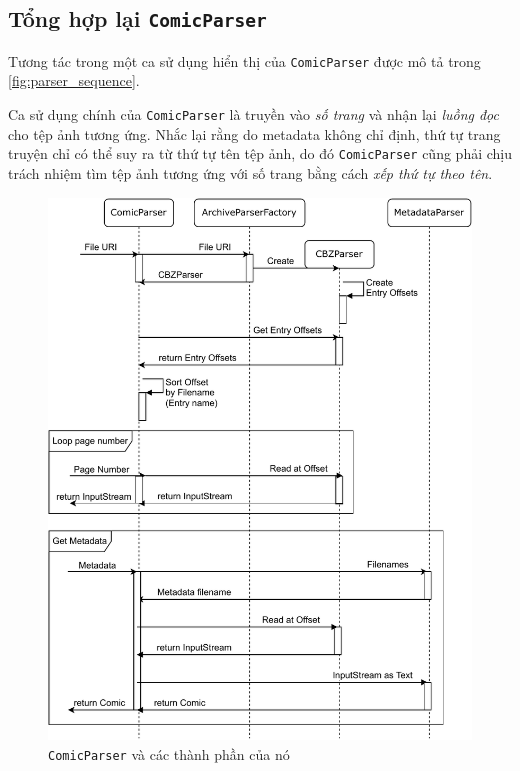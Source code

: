 \documentclass[../../../../thesis]{subfiles}
\begin{document}

\subsection{Tổng hợp lại \texttt{ComicParser}}

Tương tác trong một ca sử dụng hiển thị của \texttt{ComicParser} được mô tả
trong \autoref{fig:parser_sequence}.

Ca sử dụng chính của \texttt{ComicParser} là truyền vào \emph{số trang} và nhận
lại \emph{luồng đọc} cho tệp ảnh tương ứng. Nhắc lại rằng do metadata không chỉ
định, thứ tự trang truyện chỉ có thể suy ra từ thứ tự tên tệp ảnh, do đó
\texttt{ComicParser} cũng phải chịu trách nhiệm tìm tệp ảnh tương ứng với số
trang bằng cách \emph{xếp thứ tự theo tên}.

\begin{figure}[H]
    \centering
    \includegraphics[scale=0.8]{../images/parser_sequence.pdf}
    \caption{\texttt{ComicParser} và các thành phần của nó}
    \label{fig:parser_sequence}
\end{figure}
\end{document}
